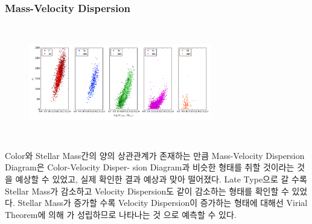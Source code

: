 \documentclass[xcolor={dvipsnames,table}]{beamer}
\newcommand\SSM{\fontsize{7}{7.2}\selectfont}
\begin{document}
\begin{frame}
 \frametitle{Mass-Velocity Dispersion}
 \SSM
 \begin{figure}
    \centering
    \includegraphics[width=8cm, height=5cm]{masssigma.png}
 \end{figure}
\vspace{0.2cm}
Color와 Stellar Mass간의 양의 상관관계가 존재하는 만큼 Mass-Velocity Dispersion Diagram은 Color-Velocity Disper-
sion Diagram과 비슷한 형태를 취할 것이라는 것을 예상할 수 있었고, 실제 확인한 결과 예상과 맞아 떨어졌다. Late Type으로 갈
수록 Stellar Mass가 감소하고 Velocity Dispersion도 같이 감소하는 형태를 확인할 수 있었다.
Stellar Mass가 증가할 수록 Velocity Dispersion이 증가하는 형태에 대해선 Virial Theorem에 의해 가 성립하므로 나타나는 것
으로 예측할 수 있다.
\end{frame}
\end{document}
